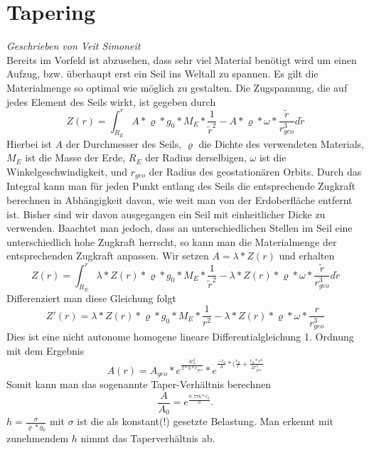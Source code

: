 \documentclass[a4paper, 10pt]{report}
\begin{document}
\section{Tapering} 
\textsl{Geschrieben von Veit Simoneit}\\
Bereits im Vorfeld ist abzusehen, dass sehr viel Material benötigt wird um einen Aufzug, bzw. überhaupt erst ein Seil ins Weltall zu spannen. Es gilt die Materialmenge so optimal wie möglich zu gestalten. 
Die Zugspannung, die auf jedes Element des Seils wirkt, ist gegeben durch
\begin{equation}
Z(r) = \int_{R_E}^{r} A*\varrho*g_0*M_E*\frac{1}{\tilde{r}^2} - A*\varrho*\omega*\frac{ \tilde{r}}{r_{geo}^3} d\tilde{r}
\end{equation}
Hierbei ist $A$ der Durchmesser des Seils, $\varrho$ die Dichte des verwendeten Materials, $M_E$ ist die Masse der Erde, $R_E$ der Radius derselbigen, $\omega$ ist die Winkelgeschwindigkeit, und $r_{geo}$ der Radius des geostationären Orbits. Durch das Integral kann man für jeden Punkt entlang des Seils die entsprechende Zugkraft berechnen in Abhängigkeit davon, wie weit man von der Erdoberfläche entfernt ist.
Bisher sind wir davon ausgegangen ein Seil mit einheitlicher Dicke zu verwenden. Baachtet man jedoch, dass an unterschiedlichen Stellen im Seil eine unterschiedlich hohe Zugkraft herrscht, so kann man die Materialmenge der entsprechenden Zugkraft anpassen.
Wir setzen $A=\lambda*Z(r)$ und erhalten
\begin{equation}
Z(r) = \int_{R_E}^{r}\lambda*Z(r)*\varrho*g_0*M_E*\frac{1}{\tilde{r}^2} - \lambda*Z(r)*\varrho*\omega*\frac{ \tilde{r}}{r_{geo}^3} d\tilde{r}
\end{equation}
Differenziert man diese Gleichung folgt
\begin{equation}
Z'(r)= \lambda*Z(r)*\varrho*g_0*M_E*\frac{1}{r^2} - \lambda*Z(r)*\varrho*\omega*\frac{r}{r_{geo}^3}
\end{equation}
Dies ist eine nicht autonome homogene lineare Differentialgleichung 1. Ordnung mit dem Ergebnis
\begin{equation}
A(r)=A_{geo}*e^\frac{3r_0^2}{2*h*r_{geo}}*e^{\frac{-r_0}{h}*(\frac{r_0}{r}+\frac{r_0*r^2}{2r_{geo}^3}}
\end{equation}
Somit kann man das sogenannte Taper-Verhältnis berechnen
\begin{equation}
\frac{A}{A_0} = e^\frac{0,776*r_0}{h}.
\end{equation}
$h=\frac{\sigma}{\varrho*g_0}$ mit $\sigma$ ist die als konstant(!) gesetzte Belastung. Man erkennt mit zunehmendem $h$ nimmt das Taperverhältnis ab.
\end{document}
